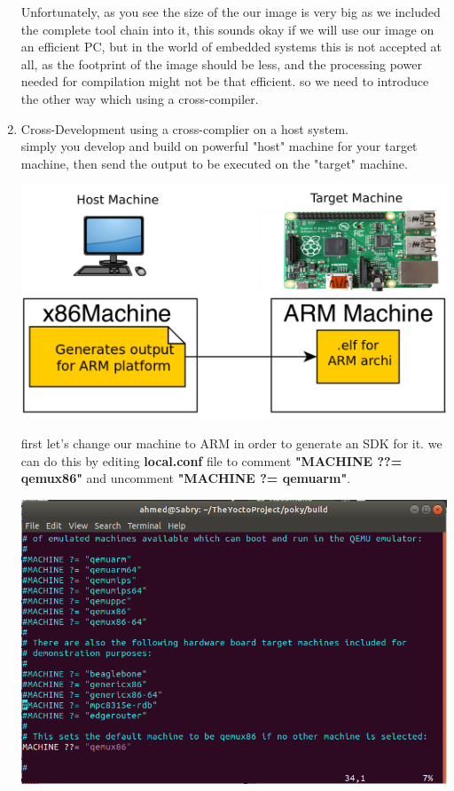\documentclass{article}
\begin{document}
\begin{enumerate}
  Unfortunately, as you see the size of the our image is very big as we included the complete tool chain into it, this sounds okay if we will use our image on an efficient PC, but in the world of embedded systems this is not accepted at all, as the footprint of the image should be less, and the processing power needed for compilation might not be that efficient. so we need to introduce the other way which using a cross-compiler.

  \item Cross-Development using a cross-complier on a host system.\\
  simply you develop and build on powerful "host" machine for your target machine, then send the output to be executed on the "target" machine.
  \begin{center}
    \includegraphics[scale=0.3]{./resources/img/cross-compile.png}
  \end{center}

  first let's change our machine to ARM in order to generate an SDK for it. we can do this by editing \textbf{local.conf} file to comment \textbf{"MACHINE ??= qemux86"} and uncomment \textbf{"MACHINE ?= qemuarm"}.
  \begin{center}
    \includegraphics[scale=0.6]{./resources/img/qemuarm.png}
  \end{center}


\end{enumerate}
\end{document}
